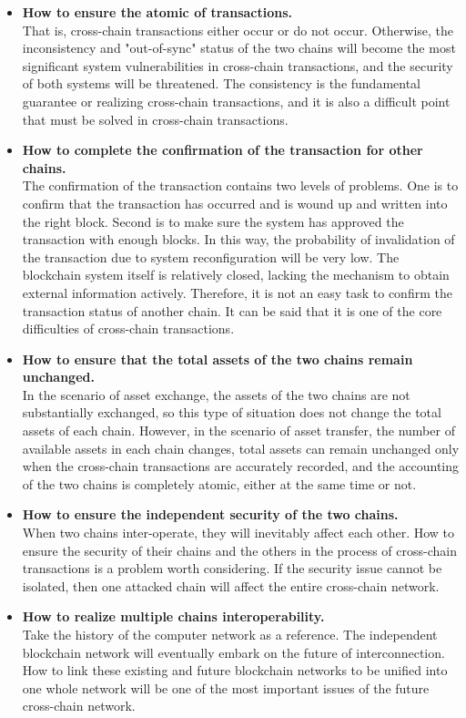 \begin{itemize}
    \item \textbf{How to ensure the atomic of transactions.}\\
    That is, cross-chain transactions either occur or do not occur. Otherwise, the inconsistency and "out-of-sync" status of the two chains will become the most significant system vulnerabilities in cross-chain transactions, and the security of both systems will be threatened. The consistency is the fundamental guarantee or realizing cross-chain transactions, and it is also a difficult point that must be solved in cross-chain transactions.
    \item \textbf{How to complete the confirmation of the transaction for other chains.} \\
The confirmation of the transaction contains two levels of problems. One is to confirm that the transaction has occurred and is wound up and written into the right block. Second is to make sure the system has approved the transaction with enough blocks.  In this way, the probability of invalidation of the transaction due to system reconfiguration will be very low. The blockchain system itself is relatively closed, lacking the mechanism to obtain external information actively. Therefore, it is not an easy task to confirm the transaction status of another chain. It can be said that it is one of the core difficulties of cross-chain transactions.
    \item \textbf{How to ensure that the total assets of the two chains remain unchanged.} \\
    In the scenario of asset exchange, the assets of the two chains are not substantially exchanged, so this type of situation does not change the total assets of each chain. However, in the scenario of asset transfer, the number of available assets in each chain changes, total assets can remain unchanged only when the cross-chain transactions are accurately recorded, and the accounting of the two chains is completely atomic, either at the same time or not. 
    \item \textbf{How to ensure the independent security of the two chains.} \\
    When two chains inter-operate, they will inevitably affect each other. How to ensure the security of their chains and the others in the process of cross-chain transactions is a problem worth considering. If the security issue cannot be isolated, then one attacked chain will affect the entire cross-chain network.
    \item \textbf{How to realize multiple chains interoperability.} \\
    Take the history of the computer network as a reference. The independent blockchain network will eventually embark on the future of interconnection. How to link these existing and future blockchain networks to be unified into one whole network will be one of the most important issues of the future cross-chain network. 
\end{itemize}

